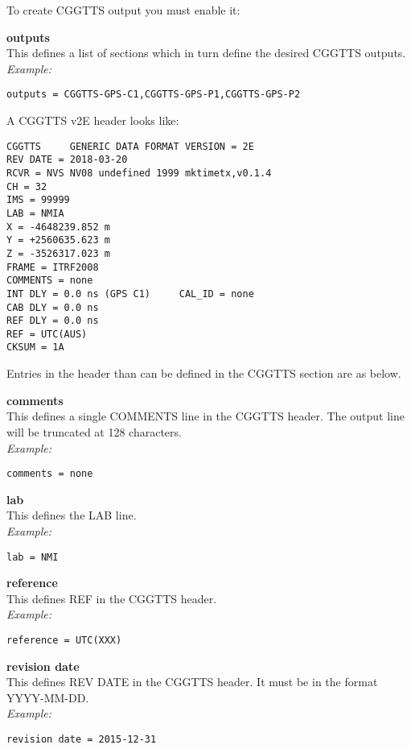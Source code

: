 To create CGGTTS output you must enable it: 


{\bfseries outputs}\\
This defines a list of sections which in turn define the desired CGGTTS outputs.\\
\textit{Example:}
\begin{lstlisting}
outputs = CGGTTS-GPS-C1,CGGTTS-GPS-P1,CGGTTS-GPS-P2
\end{lstlisting}

A CGGTTS v2E header looks like:
\begin{lstlisting}
CGGTTS     GENERIC DATA FORMAT VERSION = 2E
REV DATE = 2018-03-20
RCVR = NVS NV08 undefined 1999 mktimetx,v0.1.4
CH = 32
IMS = 99999
LAB = NMIA
X = -4648239.852 m
Y = +2560635.623 m
Z = -3526317.023 m
FRAME = ITRF2008
COMMENTS = none
INT DLY = 0.0 ns (GPS C1)     CAL_ID = none
CAB DLY = 0.0 ns
REF DLY = 0.0 ns
REF = UTC(AUS)
CKSUM = 1A
\end{lstlisting}

Entries in the header than can be defined in the CGGTTS section are as below. 

{\bfseries comments}\\
This defines a single COMMENTS line in the CGGTTS header.
The output line will be truncated at 128 characters.\\
\textit{Example:}
\begin{lstlisting}
comments = none
\end{lstlisting}

{\bfseries lab }\\
This defines the LAB line.\\
\textit{Example:}
\begin{lstlisting}
lab = NMI
\end{lstlisting}

{\bfseries reference}\\
This defines REF in the CGGTTS header.\\
\textit{Example:}
\begin{lstlisting}
reference = UTC(XXX)
\end{lstlisting}

{\bfseries revision date}\\
This defines REV DATE in the CGGTTS header. It must be in the format YYYY-MM-DD.\\
\textit{Example:}
\begin{lstlisting}
revision date = 2015-12-31
\end{lstlisting}


